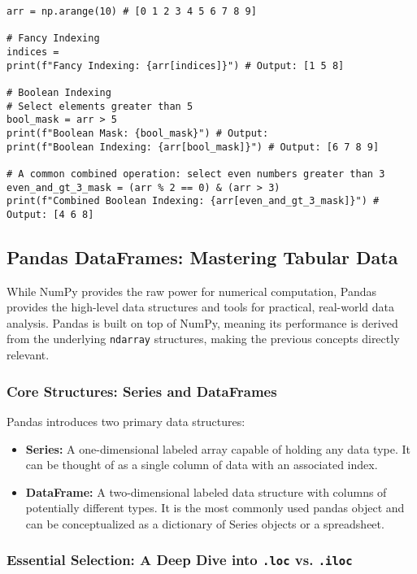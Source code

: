 \documentclass[11pt,a4paper]{article}
\begin{document}
\begin{lstlisting}
arr = np.arange(10) # [0 1 2 3 4 5 6 7 8 9]

# Fancy Indexing
indices = 
print(f"Fancy Indexing: {arr[indices]}") # Output: [1 5 8]

# Boolean Indexing
# Select elements greater than 5
bool_mask = arr > 5
print(f"Boolean Mask: {bool_mask}") # Output:
print(f"Boolean Indexing: {arr[bool_mask]}") # Output: [6 7 8 9]

# A common combined operation: select even numbers greater than 3
even_and_gt_3_mask = (arr % 2 == 0) & (arr > 3)
print(f"Combined Boolean Indexing: {arr[even_and_gt_3_mask]}") # Output: [4 6 8]
\end{lstlisting}

\subsection{Pandas DataFrames: Mastering Tabular Data}

While NumPy provides the raw power for numerical computation, Pandas provides the high-level data structures and tools for practical, real-world data analysis. Pandas is built on top of NumPy, meaning its performance is derived from the underlying \texttt{ndarray} structures, making the previous concepts directly relevant.

\subsubsection{Core Structures: Series and DataFrames}

Pandas introduces two primary data structures:
\begin{itemize}
    \item \textbf{Series:} A one-dimensional labeled array capable of holding any data type. It can be thought of as a single column of data with an associated index.
    \item \textbf{DataFrame:} A two-dimensional labeled data structure with columns of potentially different types. It is the most commonly used pandas object and can be conceptualized as a dictionary of Series objects or a spreadsheet.
\end{itemize}

\subsubsection{Essential Selection: A Deep Dive into \texttt{.loc} vs. \texttt{.iloc}}
\end{document}
